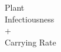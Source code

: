 \documentclass[preview]{standalone}
\begin{document}
\begin{center}
Plant\\Infectiousness\\+\\Carrying Rate
\end{center}
\end{document}
